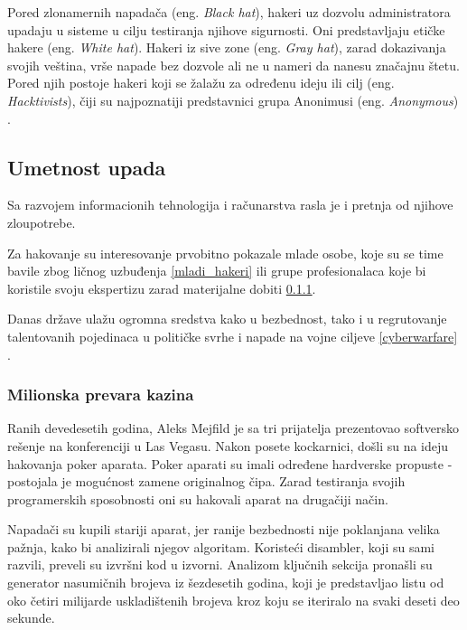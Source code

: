 \documentclass[a4paper]{article}
\begin{document}
Pored zlonamernih napadača (eng. \textit{Black hat}), hakeri uz dozvolu administratora upadaju u sisteme u cilju testiranja njihove sigurnosti. Oni predstavljaju etičke hakere (eng. \textit{White hat}). Hakeri iz sive zone (eng. \textit{Gray hat}), zarad dokazivanja svojih veština, vrše napade bez dozvole ali ne u nameri da nanesu značajnu štetu. Pored njih postoje hakeri koji se žalažu za određenu ideju ili cilj (eng. \textit{Hacktivists}), čiji su najpoznatiji predstavnici grupa Anonimusi (eng. \textit{Anonymous}) \cite{hackers_hat}.
 
\subsection{Umetnost upada}
\label{sec:intrusion}

Sa razvojem informacionih tehnologija i računarstva rasla je i pretnja od njihove zloupotrebe. 

Za hakovanje su interesovanje prvobitno pokazale mlade osobe, koje su se time bavile zbog ličnog uzbuđenja \ref{mladi_hakeri} ili grupe profesionalaca koje bi koristile svoju ekspertizu zarad materijalne dobiti \ref{milionska_prevara_kazina}.

Danas države ulažu ogromna sredstva kako u bezbednost, tako i u regrutovanje talentovanih pojedinaca u političke svrhe i napade na vojne ciljeve \ref{cyberwarfare} \cite{intrusion}.

\subsubsection{Milionska prevara kazina}
\label{milionska_prevara_kazina}

Ranih devedesetih godina, Aleks Mejfild je sa tri prijatelja prezentovao softversko rešenje na konferenciji u Las Vegasu. Nakon posete kockarnici, došli su na ideju hakovanja poker aparata. Poker aparati su imali određene hardverske propuste - postojala je mogućnost zamene originalnog čipa. Zarad testiranja svojih programerskih sposobnosti oni su hakovali aparat na drugačiji način.

Napadači su kupili stariji aparat, jer ranije bezbednosti nije poklanjana velika pažnja, kako bi analizirali njegov algoritam. Koristeći disambler, koji su sami razvili, preveli su izvršni kod u izvorni. Analizom ključnih sekcija pronašli su generator nasumičnih brojeva iz šezdesetih godina, koji je predstavljao listu od oko četiri milijarde uskladištenih brojeva kroz koju se iteriralo na svaki deseti deo sekunde.
\end{document}
